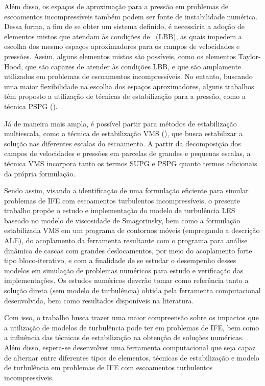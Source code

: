 Além disso, os espaços de aproximação para a pressão em problemas de escoamentos incompressíveis também podem ser fonte de instabilidade numérica. Dessa forma, a fim de se obter um sistema definido, é necessária a adoção de elementos mistos que atendam às condições de \LBB\ (LBB), as quais impedem a escolha dos mesmo espaços aproximadores para os campos de velocidades e pressões. Assim, alguns elementos mistos são possíveis, como os elementos Taylor-Hood, que são capazes de atender às condições LBB, e que são amplamente utilizados em problemas de escoamentos incompressíveis. No entanto, buscando uma maior flexibilidade na escolha dos espaços aproximadores, alguns trabalhos têm proposto a utilização de técnicas de estabilização para a pressão, como a técnica PSPG (\PSPG).

Já de maneira mais ampla, é possível partir para métodos de estabilização multiescala, como a técnica de estabilização VMS (\VMS), que busca estabilizar a solução nas diferentes escalas do escoamento. A partir da decomposição dos campos de velocidades e pressões em parcelas de grandes e pequenas escalas, a técnica VMS incorpora tanto os termos SUPG e PSPG quanto termos adicionais da própria formulação.

Sendo assim, visando a identificação de uma formulação eficiente para simular problemas de IFE com escoamentos turbulentos incompressíveis, o presente trabalho propõe o estudo e implementação do modelo de turbulência LES baseado no modelo de viscosidade de Smagorinsky, bem como a formulação estabilizada VMS em um programa de contornos móveis (empregando a descrição ALE), do acoplamento da ferramenta resultante com o programa para análise dinâmica de cascas com grandes deslocamentos, por meio do acoplamento forte tipo bloco-iterativo, e com a finalidade de se estudar o desempenho desses modelos em simulação de problemas numéricos para estudo e verificação das implementações. Os estudos numéricos deverão tomar como referência tanto a solução direta (sem modelo de turbulência) obtida pela ferramenta computacional desenvolvida, bem como resultados disponíveis na literatura.

Com isso, o trabalho busca trazer uma maior compreensão sobre os impactos que a utilização de modelos de turbulência pode ter em problemas de IFE, bem como a influência das técnicas de estabilização na obtenção de soluções numéricas. Além disso, espera-se desenvolver uma ferramenta computacional que seja capaz de alternar entre diferentes tipos de elementos, técnicas de estabilização e modelo de turbulência em problemas de IFE com escoamentos turbulentos incompressíveis.

